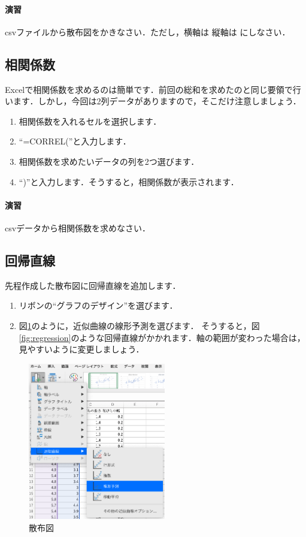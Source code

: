 \paragraph{演習}

csvファイルから散布図をかきなさい．ただし，横軸は 縦軸は にしなさい．


\subsection{相関係数}

Excelで相関係数を求めるのは簡単です．前回の総和を求めたのと同じ要領で行います．しかし，今回は2列データがありますので，そこだけ注意しましょう．

\begin{enumerate}
    \item 相関係数を入れるセルを選択します．
    \item ``=CORREL(''と入力します．
    \item 相関係数を求めたいデータの列を2つ選びます．
    \item ``)''と入力します．そうすると，相関係数が表示されます．
\end{enumerate}

\paragraph{演習}
csvデータから相関係数を求めなさい．

\subsection{回帰直線}

先程作成した散布図に回帰直線を追加します．

\begin{enumerate}
    \item リボンの``グラフのデザイン''を選びます．
    \item 図\ref{fig:regression_menu}のように，近似曲線の線形予測を選びます．
    そうすると，図\ref{fig:regression}のような回帰直線がかかれます．軸の範囲が変わった場合は，見やすいように変更しましょう．
\end{enumerate}

\begin{figure}[htbp]
    \centering
    \includegraphics[width=6cm]{chap2/regression_menu.png}
    \caption{散布図}
    \label{fig:regression_menu}
\end{figure}

